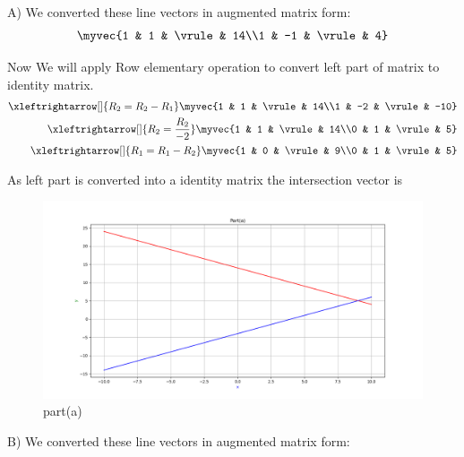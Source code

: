 \begin{enumerate}[label=\thesection.\arabic*.,ref=\thesection.\theenumi]
A)
We converted these line vectors in augmented matrix form:\\ 

\begin{align*}
    \myvec{1 & 1 & \vrule & 14\\1 & -1 & \vrule & 4}\\
\end{align*} 

Now We will apply Row elementary operation to convert left part of matrix to identity matrix.\\

\begin{align*}
    \xleftrightarrow[]{R_{2}=R_{2}-R_{1}} \myvec{1 & 1 & \vrule & 14\\1 & -2 & \vrule & -10}
\\
    \xleftrightarrow[]{R_{2}=\frac{R_{2}}{-2}} \myvec{1 & 1 & \vrule & 14\\0 & 1 & \vrule & 5}
\\
    \xleftrightarrow[]{R_{1}=R_{1}-R_{2}} \myvec{1 & 0 & \vrule & 9\\0 & 1 & \vrule & 5}
\end{align*}

As left part is converted into a identity matrix the intersection vector is \\
    
\renewcommand{\thefigure}{\theenumi.\arabic{figure}}
\begin{figure}[!ht]
    \centering
    \includegraphics[width=\columnwidth]{./figures/A1_parta}
\caption{part(a)}
\label{fig: part(a)}
\end{figure}

B)
We converted these line vectors in augmented matrix form:\\ 


\end{enumerate}
